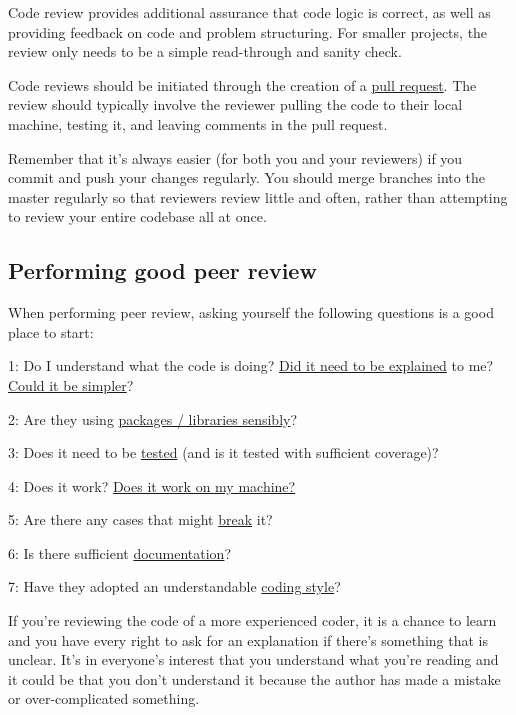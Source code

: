 \documentclass[]{book}
\begin{document}
Code review provides additional assurance that code logic is correct, as well as providing feedback on code and problem structuring. For smaller projects, the review only needs to be a simple read-through and sanity check.

Code reviews should be initiated through the creation of a \protect\hyperlink{flow}{pull request}. The review should typically involve the reviewer pulling the code to their local machine, testing it, and leaving comments in the pull request.

Remember that it's always easier (for both you and your reviewers) if you commit and push your changes regularly. You should merge branches into the master regularly so that reviewers review little and often, rather than attempting to review your entire codebase all at once.

\hypertarget{performing-good-peer-review}{%
\subsection*{Performing good peer review}\label{performing-good-peer-review}}

When performing peer review, asking yourself the following questions is a good place to start:

1: Do I understand what the code is doing? \protect\hyperlink{ccc}{Did it need to be explained} to me? \protect\hyperlink{ccc}{Could it be simpler}?

2: Are they using \protect\hyperlink{defaults}{packages / libraries sensibly}?

3: Does it need to be \protect\hyperlink{unittest}{tested} (and is it tested with sufficient coverage)?

4: Does it work? \protect\hyperlink{projdep}{Does it work on my machine?}

5: Are there any cases that might \protect\hyperlink{unittest}{break} it?

6: Is there sufficient \protect\hyperlink{readme}{documentation}?

7: Have they adopted an understandable \protect\hyperlink{style}{coding style}?

If you're reviewing the code of a more experienced coder, it is a chance to learn and you have every right to ask for an explanation if there's something that is unclear. It's in everyone's interest that you understand what you're reading and it could be that you don't understand it because the author has made a mistake or over-complicated something.
\end{document}
